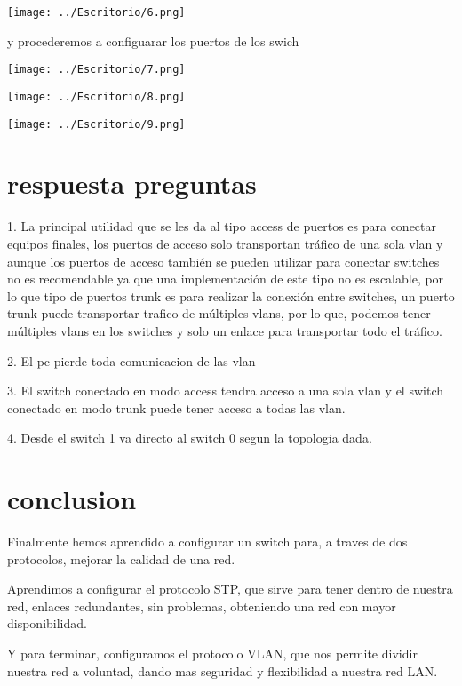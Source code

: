 \documentclass[11pt,a4paper]{report}
\begin{document}
\texttt{[image: ../Escritorio/6.png]}  

	y procederemos a configuarar los puertos de los swich
	
\texttt{[image: ../Escritorio/7.png]} 

\texttt{[image: ../Escritorio/8.png]} 

\texttt{[image: ../Escritorio/9.png]} 

\section{respuesta preguntas}

1.	La principal utilidad que se les da al tipo access de puertos es para conectar equipos finales, los puertos de acceso solo  transportan tráfico de una sola vlan y aunque los puertos de acceso también se pueden utilizar para conectar switches no es recomendable ya que una implementación de este tipo no es escalable, por lo que tipo de puertos trunk es para realizar la conexión entre switches, un puerto trunk puede transportar trafico de múltiples vlans, por lo que, podemos tener múltiples vlans en los switches y solo un enlace para transportar todo el tráfico.

2.	El pc pierde toda comunicacion de las vlan

3.	El switch conectado en modo access tendra acceso a una sola vlan y el switch conectado en modo trunk puede tener acceso a todas las vlan.

4.	Desde el switch 1 va directo al switch 0 segun la topologia dada.

\section{conclusion}	
	Finalmente hemos aprendido a configurar un switch para, a traves de dos protocolos, mejorar la calidad de una red.

Aprendimos a configurar el protocolo STP, que sirve para tener dentro de nuestra red, enlaces redundantes, sin problemas, obteniendo una red con mayor disponibilidad.

Y para terminar, configuramos el protocolo VLAN, que nos permite dividir nuestra red a voluntad, dando mas seguridad y flexibilidad a nuestra red LAN. 
  
\end{document}
